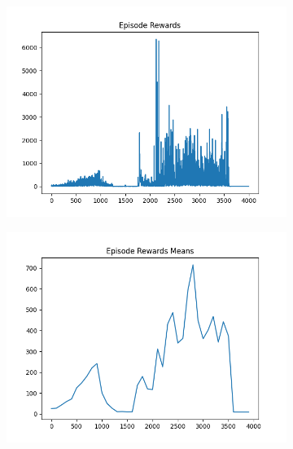 \begin{figure}[H]
    \centering
    \begin{subfigure}{.47\linewidth}
        \centering
        \includegraphics[width=\textwidth]{pole/2024-06-14_13-15-56_dqn_cartpole_episode_rewards.png}
    \end{subfigure}
    \begin{subfigure}{.47\linewidth}
        \centering
        \includegraphics[width=\textwidth]{pole/2024-06-14_13-15-56_dqn_cartpole_episode_rewards_means.png}
    \end{subfigure}
    \begin{subfigure}{.47\linewidth}
        \centering

\end{subfigure}
\end{figure}
